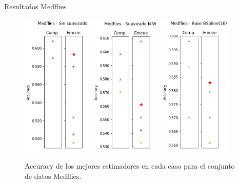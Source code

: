 \documentclass[10pt, professionalfonts]{beamer}
\begin{document}

\begin{frame}{Resultados Medflies}
  \begin{figure}
    \includegraphics[width=0.3\textwidth]{img/results-new/clf_medflies_none}\hfill
    \includegraphics[width=0.305\textwidth]{img/results-new/clf_medflies_nw}\hfill
    \includegraphics[width=0.315\textwidth]{img/results-new/clf_medflies_basis}
    \caption{Accuracy de los mejores estimadores en cada caso para el conjunto de datos Medflies.}
  \end{figure}
\end{frame}
\end{document}
